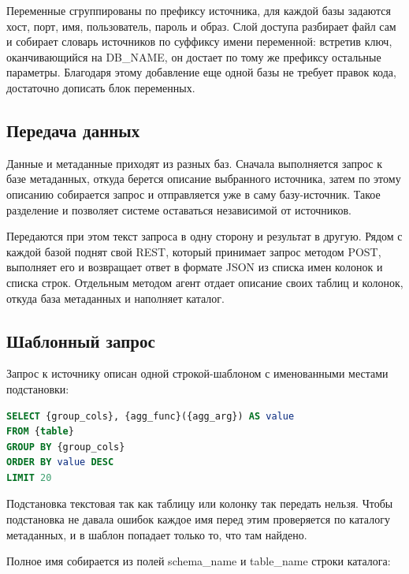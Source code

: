 \documentclass[areasetadvanced]{scrartcl}
\begin{document}
Переменные сгруппированы по префиксу источника, для каждой базы задаются хост, порт, имя, пользователь, пароль и образ.
Слой доступа разбирает файл сам и собирает словарь источников по суффиксу имени переменной: встретив ключ,
оканчивающийся на DB\_NAME, он достает по тому же префиксу остальные параметры. Благодаря этому добавление
еще одной базы не требует правок кода, достаточно дописать блок переменных.

    \subsection{Передача данных}
Данные и метаданные приходят из разных баз. Сначала выполняется запрос к базе метаданных, откуда берется описание
выбранного источника, затем по этому описанию собирается запрос и отправляется уже в саму базу-источник.
Такое разделение и позволяет системе оставаться независимой от источников.

Передаются при этом текст запроса в одну сторону и результат в другую. Рядом с каждой базой
поднят свой REST, который принимает запрос методом POST, выполняет его и возвращает ответ в формате JSON
из списка имен колонок и списка строк. Отдельным методом агент отдает описание своих таблиц и колонок,
откуда база метаданных и наполняет каталог.

\newpage
    \subsection{Шаблонный запрос}
Запрос к источнику описан одной строкой-шаблоном с именованными
местами подстановки:

\begin{lstlisting}[language=SQL, caption={Шаблон запроса к источнику}, label={lis:query_template}]
SELECT {group_cols}, {agg_func}({agg_arg}) AS value
FROM {table}
GROUP BY {group_cols}
ORDER BY value DESC
LIMIT 20
\end{lstlisting}

Подстановка текстовая так как таблицу или колонку так передать нельзя.
 Чтобы подстановка не давала ошибок
каждое имя перед этим проверяется по каталогу метаданных, и в шаблон попадает только то, что там найдено.

Полное имя собирается из полей schema\_name и table\_name строки каталога:
\end{document}
